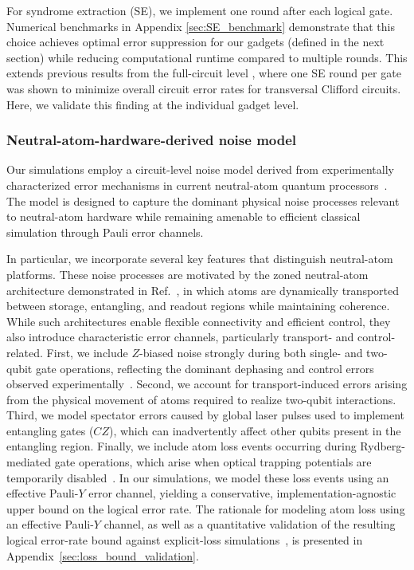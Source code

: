 \documentclass[aps, prx, reprint, superscriptaddress, longbibliography, floatfix]{revtex4-2}
\begin{document}
For syndrome extraction (SE), we implement one round after each logical gate. Numerical benchmarks in Appendix \ref{sec:SE_benchmark} demonstrate that this choice achieves optimal error suppression for our gadgets (defined in the next section) while reducing computational runtime compared to multiple rounds. This extends previous results from the full-circuit level \cite{Cain2025, Zhou2025}, where one SE round per gate was shown to minimize overall circuit error rates for transversal Clifford circuits. Here, we validate this finding at the individual gadget level.


\subsubsection{Neutral-atom-hardware-derived noise model}
\label{sec:hardware_noise_model}

Our simulations employ a circuit-level noise model derived from experimentally characterized error mechanisms in current neutral-atom quantum processors~\cite{Rodriguez2024, Bluvstein2024, Bluvstein2025b}. The model is designed to capture the dominant physical noise processes relevant to neutral-atom hardware while remaining amenable to efficient classical simulation through Pauli error channels.

In particular, we incorporate several key features that distinguish neutral-atom platforms. These noise processes are motivated by the zoned neutral-atom architecture demonstrated in Ref.~\cite{Bluvstein2024}, in which atoms are dynamically transported between storage, entangling, and readout regions while maintaining coherence. While such architectures enable flexible connectivity and efficient control, they also introduce characteristic error channels, particularly transport- and control-related. First, we include $Z$-biased noise strongly during both single- and two-qubit gate operations, reflecting the dominant dephasing and control errors observed experimentally~\cite{Evered2023}. Second, we account for transport-induced errors arising from the physical movement of atoms required to realize two-qubit interactions. Third, we model spectator errors caused by global laser pulses used to implement entangling gates ($CZ$), which can inadvertently affect other qubits present in the entangling region. Finally, we include atom loss events occurring during Rydberg-mediated gate operations, which arise when optical trapping potentials are temporarily disabled~\cite{Evered2023, Bluvstein2024}. In our simulations, we model these loss events using an effective Pauli-$Y$ error channel, yielding a conservative, implementation-agnostic upper bound on the logical error rate. The rationale for modeling atom loss using an effective Pauli-$Y$ channel, as well as a quantitative validation of the resulting logical error-rate bound against explicit-loss simulations~\cite{baranes2025}, is presented in Appendix~\ref{sec:loss_bound_validation}.
\end{document}
